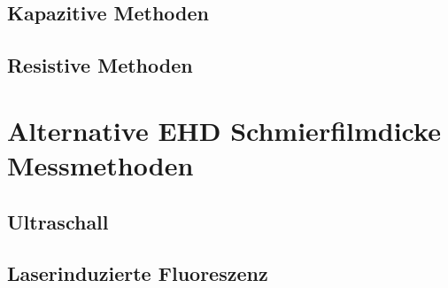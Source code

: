 \subsection{Kapazitive Methoden}
\label{ssec:kapazitive_methoden}

\subsection{Resistive Methoden}
\label{ssec:resistive_methoden}

\section{Alternative EHD Schmierfilmdicke Messmethoden}
\label{sec:alternative_messmethoden}

\subsection{Ultraschall}
\label{ssec:ultraschall}

\subsection{Laserinduzierte Fluoreszenz}
\label{ssec:laserinduzierte_fluoreszenz}
